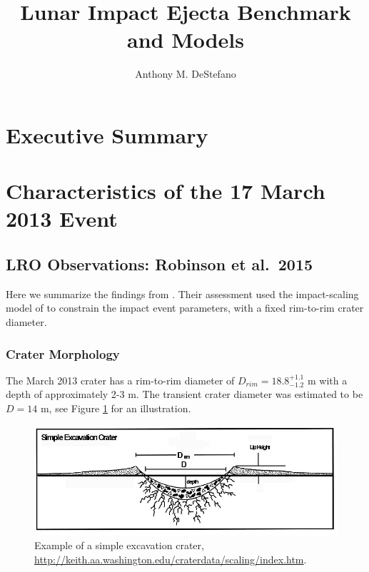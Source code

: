 \documentclass{hitec}
\title{Lunar Impact Ejecta Benchmark and Models}
\author{Anthony M. DeStefano}
\numberwithin{equation}{section}
\begin{document}
\maketitle
{}

\tableofcontents
\listoffigures
\listoftables
\newpage






\cleardoublepage
{}
\section{Executive Summary}



\section{Characteristics of the 17 March 2013 Event}

\subsection{LRO Observations: Robinson et al.\ 2015}
Here we summarize the findings from \cite{robinson2015new}. Their assessment used the impact-scaling model of \cite{holsapple1993scaling} to constrain the impact event parameters, with a fixed rim-to-rim crater diameter.

\subsubsection{Crater Morphology}
The March 2013 crater has a rim-to-rim diameter of $D_{rim} = 18.8_{-1.2}^{+1.1}$ m with a depth of approximately 2-3 m. The transient crater diameter was estimated to be $D = 14$ m, see Figure \ref{fig:simpleExcavationCrater-Holsapple} for an illustration.
\begin{figure}[h!]
	\centering
	\includegraphics[scale=0.4]{simpleExcavationCrater-Holsapple.jpg}
	\caption{Example of a simple excavation crater, \url{http://keith.aa.washington.edu/craterdata/scaling/index.htm}.}\label{fig:simpleExcavationCrater-Holsapple}
\end{figure}
\end{document}

